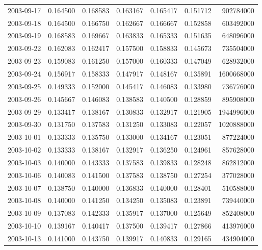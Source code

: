 \begin{tabular}{lrrrrrr}
2003-09-17 &    0.164500 &    0.168583 &    0.163167 &    0.165417 &    0.151712 &   902784000 \\
2003-09-18 &    0.164500 &    0.166750 &    0.162667 &    0.166667 &    0.152858 &   603492000 \\
2003-09-19 &    0.168583 &    0.169667 &    0.163833 &    0.165333 &    0.151635 &   648096000 \\
2003-09-22 &    0.162083 &    0.162417 &    0.157500 &    0.158833 &    0.145673 &   735504000 \\
2003-09-23 &    0.159083 &    0.161250 &    0.157000 &    0.160333 &    0.147049 &   628932000 \\
2003-09-24 &    0.156917 &    0.158333 &    0.147917 &    0.148167 &    0.135891 &  1600668000 \\
2003-09-25 &    0.149333 &    0.152000 &    0.145417 &    0.146083 &    0.133980 &   736776000 \\
2003-09-26 &    0.145667 &    0.146083 &    0.138583 &    0.140500 &    0.128859 &   895908000 \\
2003-09-29 &    0.133417 &    0.138167 &    0.130833 &    0.132917 &    0.121905 &  1944996000 \\
2003-09-30 &    0.131750 &    0.137583 &    0.131250 &    0.133083 &    0.122057 &  1020888000 \\
2003-10-01 &    0.133333 &    0.135750 &    0.133000 &    0.134167 &    0.123051 &   877224000 \\
2003-10-02 &    0.133333 &    0.138167 &    0.132917 &    0.136250 &    0.124961 &   857628000 \\
2003-10-03 &    0.140000 &    0.143333 &    0.137583 &    0.139833 &    0.128248 &   862812000 \\
2003-10-06 &    0.140083 &    0.141500 &    0.137583 &    0.138750 &    0.127254 &   377028000 \\
2003-10-07 &    0.138750 &    0.140000 &    0.136833 &    0.140000 &    0.128401 &   510588000 \\
2003-10-08 &    0.140000 &    0.141250 &    0.134250 &    0.135083 &    0.123891 &   739440000 \\
2003-10-09 &    0.137083 &    0.142333 &    0.135917 &    0.137000 &    0.125649 &   852408000 \\
2003-10-10 &    0.139167 &    0.140417 &    0.137500 &    0.139417 &    0.127866 &   413976000 \\
2003-10-13 &    0.141000 &    0.143750 &    0.139917 &    0.140833 &    0.129165 &   434904000 \\

\end{tabular}
